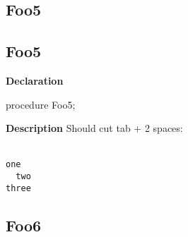 \documentclass{report}
\newif\ifpdf
\begin{document}
\subsection*{\large{\textbf{Foo5}}\normalsize\hspace{1ex}\hrulefill}
\else
\subsection*{Foo5}
\fi
\label{ok_longcode_indentation-Foo5}
\begin{list}{}{
\setlength{\itemindent}{0cm}
\setlength{\listparindent}{0cm}
\setlength{\leftmargin}{\evensidemargin}
\addtolength{\leftmargin}{\tmplength}
\settowidth{\labelsep}{X}
\addtolength{\leftmargin}{\labelsep}
\setlength{\labelwidth}{\tmplength}
}
\item[\textbf{Declaration}\hfill]
\ifpdf
\begin{flushleft}
\fi
\begin{ttfamily}
procedure Foo5;\end{ttfamily}

\ifpdf
\end{flushleft}
\fi

\par
\item[\textbf{Description}]
Should cut tab + 2 spaces:

\texttt{\\\nopagebreak[3]
one\\\nopagebreak[3]
~~two\\\nopagebreak[3]
three\\
}

\end{list}
\ifpdf
\subsection*{\large{\textbf{Foo6}}\normalsize\hspace{1ex}\hrulefill}
\else
\end{document}
